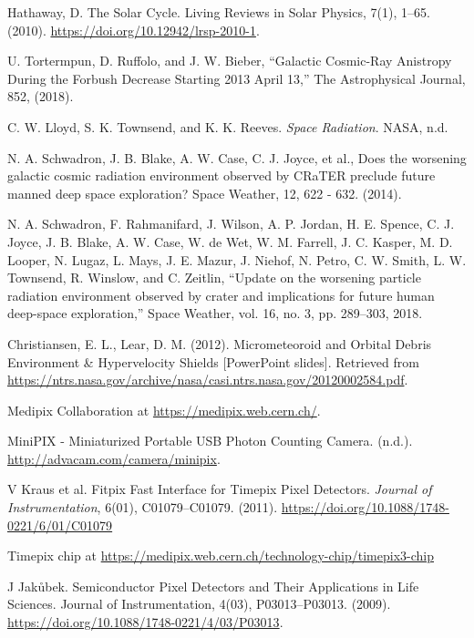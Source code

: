 \begin{thebibliography}{9}
  Hathaway, D. The Solar Cycle. Living Reviews in Solar Physics, 7(1), 1–65. (2010). \url{https://doi.org/10.12942/lrsp-2010-1}.

  U. Tortermpun, D. Ruffolo, and J. W. Bieber, “Galactic Cosmic-Ray Anistropy During the Forbush Decrease Starting 2013 April 13,” The Astrophysical Journal, 852, (2018).

  C. W. Lloyd, S. K. Townsend, and K. K. Reeves. \textit{Space Radiation}. NASA, n.d.

  N. A. Schwadron, J. B. Blake, A. W. Case, C. J. Joyce, et al., Does the worsening galactic cosmic radiation environment observed by CRaTER preclude future manned deep space exploration? Space Weather, 12, 622 - 632. (2014).

N. A. Schwadron, F. Rahmanifard, J. Wilson, A. P. Jordan, H. E. Spence, C. J. Joyce, J. B.
Blake, A. W. Case, W. de Wet, W. M. Farrell, J. C. Kasper, M. D. Looper, N. Lugaz, L. Mays,
J. E. Mazur, J. Niehof, N. Petro, C. W. Smith, L. W. Townsend, R. Winslow, and C. Zeitlin,
“Update on the worsening particle radiation environment observed by crater and implications
for future human deep-space exploration,” Space Weather, vol. 16, no. 3, pp. 289–303, 2018.

  Christiansen, E. L., Lear, D. M. (2012). Micrometeoroid and Orbital Debris Environment \& Hypervelocity Shields [PowerPoint slides]. Retrieved from \url{https://ntrs.nasa.gov/archive/nasa/casi.ntrs.nasa.gov/20120002584.pdf}.

  Medipix Collaboration at \url{https://medipix.web.cern.ch/}.

  MiniPIX - Miniaturized Portable USB Photon Counting Camera. (n.d.). \url{http://advacam.com/camera/minipix}.

  V Kraus et al. Fitpix Fast Interface for Timepix Pixel Detectors. \textit{Journal of Instrumentation}, 6(01), C01079–C01079. (2011). \url{https://doi.org/10.1088/1748-0221/6/01/C01079}

  Timepix chip at \url{https://medipix.web.cern.ch/technology-chip/timepix3-chip}

  J Jakůbek. Semiconductor Pixel Detectors and Their Applications in Life Sciences. Journal of Instrumentation, 4(03), P03013–P03013. (2009). \url{https://doi.org/10.1088/1748-0221/4/03/P03013}.


\end{thebibliography}
